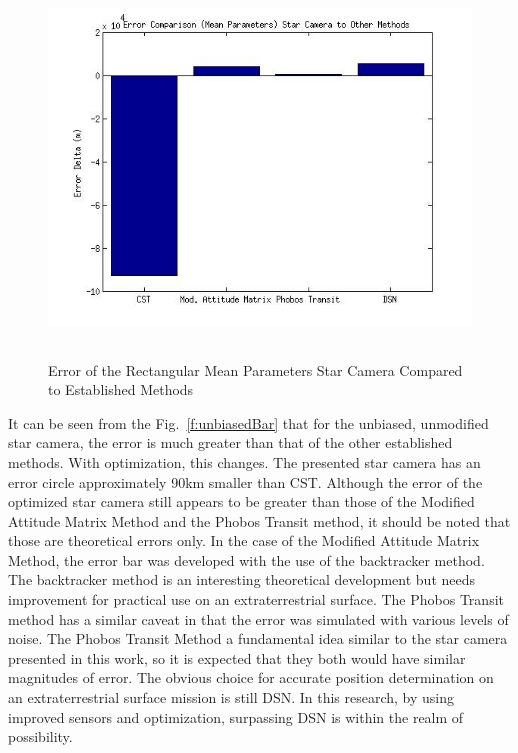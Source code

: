 \documentclass[12pt,a4paper]{book}
\begin{document}
\begin{figure}[!ht]
\centering
\includegraphics[height=10cm]{meanParamBars.jpg}
\caption{Error of the Rectangular Mean Parameters Star Camera Compared to Established Methods}\label{f:rmpBar}
\end{figure}
It can be seen from the Fig.~\ref{f:unbiasedBar} that for the unbiased, unmodified star camera, the error is much greater than that of the other established methods.  With optimization, this changes.  The presented star camera has an error circle approximately 90km smaller than CST.  Although the error of the optimized star camera still appears to be greater than those of the Modified Attitude Matrix Method and the Phobos Transit method, it should be noted that those are theoretical errors only.  In the case of the Modified Attitude Matrix Method, the error bar was developed with the use of the backtracker method.  The backtracker method is an interesting theoretical development but needs improvement for practical use on an extraterrestrial surface.  The Phobos Transit method has a similar caveat in that the error was simulated with various levels of noise.  The Phobos Transit Method a fundamental idea similar to the star camera presented in this work, so it is expected that they both would have similar magnitudes of error.  The obvious choice for accurate position determination on an extraterrestrial surface mission is still DSN.  In this research, by using improved sensors and optimization, surpassing DSN is within the realm of possibility.
\end{document}
